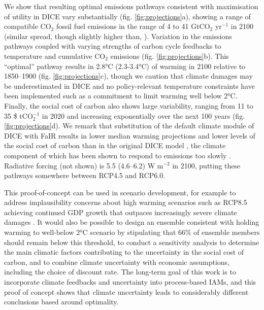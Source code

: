 \documentclass{article}
\begin{document}
We show that resulting optimal emissions pathways consistent with maximisation of utility in DICE vary substantially (fig. \ref{fig:projections}a), showing a range of compatible CO$_2$ fossil fuel emissions in the range of 4 to 41 GtCO$_2$ yr$^{-1}$ in 2100 (similar spread, though slightly higher than, \citet{Folini2022}). Variation in the emissions pathways coupled with varying strengths of carbon cycle feedbacks to temperature and cumulative CO$_2$ emissions (fig. \ref{fig:projections}b). This ``optimal'' pathway results in 2.8°C (2.3-3.4°C) of warming in 2100 relative to 1850--1900 (fig. \ref{fig:projections}c), though we caution that climate damages may be underestimated in DICE \citep{Dietz2015} and no policy-relevant temperature constraints have been implemented such as a commitment to limit warming well below 2°C. Finally, the social cost of carbon also shows large variability, ranging from 11 to 35 \$ tCO$_2^{-1}$ in 2020 and increasing exponentially over the next 100 years (fig. \ref{fig:projections}d). We remark that substitution of the default climate module of DICE with FaIR results in lower median warming projections and lower levels of the social cost of carbon than in the original DICE model \citep{Nordhaus2017}, the climate component of which has been shown to respond to emissions too slowly \citep{Folini2022,Gasser2021}. Radiative forcing (not shown) is 5.5 (4.6--6.2) W m$^{-2}$ in 2100, putting these pathways somewhere between RCP4.5 and RCP6.0.

This proof-of-concept can be used in scenario development, for example to address implausibility concerns about high warming scenarios such as RCP8.5 achieving continued GDP growth that outpaces increasingly severe climate damages \citep{Woodard2019}. It would also be possible to design an ensemble consistent with holding warming to well-below 2°C scenario by stipulating that 66\% of ensemble members should remain below this threshold, to conduct a sensitivity analysis to determine the main climatic factors contributing to the uncertainty in the social cost of carbon, and to combine climate uncertainty with economic assumptions, including the choice of discount rate. The long-term goal of this work is to incorporate climate feedbacks and uncertainty into process-based IAMs, and this proof of concept shows that climate uncertainty leads to considerably different conclusions based around optimality.


\end{document}
